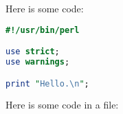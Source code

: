 \documentclass{article}
\begin{document}
Here is some code:

\begin{lstlisting}[language=Perl]
#!/usr/bin/perl

use strict;
use warnings;

print "Hello.\n";

\end{lstlisting}

Here is some code in a file:


\end{document}
